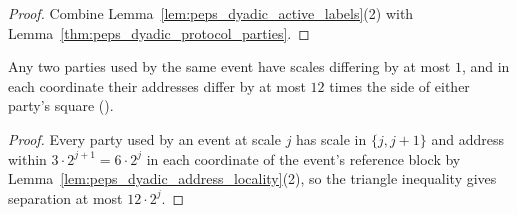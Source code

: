 \begin{proof}\leanok
    Combine Lemma~\ref{lem:peps_dyadic_active_labels}(2) with
    Lemma~\ref{thm:peps_dyadic_protocol_parties}.
\end{proof}

\begin{lemma}
    \label{thm:peps_dyadic_protocol_locality}
    \leanok
    Any two parties used by the same event have scales differing by at most $1$,
    and in each coordinate their addresses differ by at most $12$ times the side of
    either party's square
    (\cite[Proposition~7.1, item~3]{OpenAI2026PolynomialPEPS}).
\end{lemma}

\begin{proof}\leanok
    Every party used by an event at scale $j$ has scale in $\{j,j+1\}$ and address
    within $3\cdot2^{j+1}=6\cdot2^j$ in each coordinate of the event's reference
    block by Lemma~\ref{lem:peps_dyadic_address_locality}(2), so the triangle
    inequality gives separation at most $12\cdot2^j$.
\end{proof}

